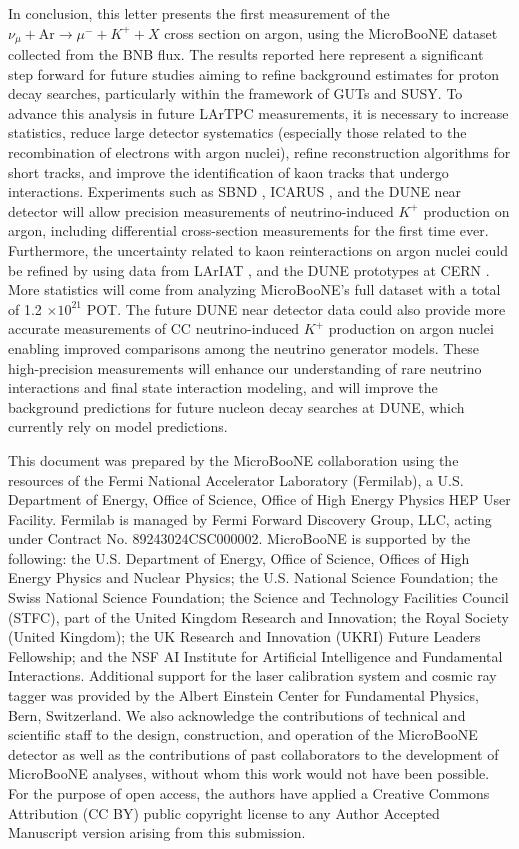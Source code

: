 \documentclass[aps,prd,longbibliography,twocolumn,showpacs,superscriptaddress,floatfix,10pt]{revtex4-1}
\begin{document}
In conclusion, this letter presents the first measurement of the $\nu_{\mu} + \text{Ar} \rightarrow \mu^{-} + K^{+} + X$ cross section on argon, using the MicroBooNE dataset collected from the BNB flux.
The results reported here represent a significant step forward for future studies aiming to refine background estimates for proton decay searches, particularly within the framework of GUTs and SUSY. To advance this analysis in future LArTPC measurements, it is necessary to increase statistics, reduce large detector systematics (especially those related to the recombination of electrons with argon nuclei), refine reconstruction algorithms for short tracks, and improve the identification of kaon tracks that undergo interactions. Experiments such as SBND \cite{sbndcollaboration2025shortbaselineneardetectorfermilab}, ICARUS \cite{AMERIO2004329}, and the DUNE near detector will allow precision measurements of neutrino-induced $K^+$ production on argon, including differential cross-section measurements for the first time ever. 
Furthermore, the uncertainty related to kaon reinteractions on argon nuclei could be refined by using data from LArIAT \cite{osti_1489387}, and the DUNE prototypes at CERN \cite{PhysRevD.110.092011}. More statistics will come from analyzing MicroBooNE's full dataset with a total of 1.2 $\times 10^{21}$ POT. The future DUNE near detector data could also provide more accurate measurements of CC neutrino-induced $K^{+}$ production on argon nuclei enabling improved comparisons among the neutrino generator models. These high-precision measurements will enhance our understanding of rare neutrino interactions and final state interaction modeling, and will improve the background predictions for future nucleon decay searches at DUNE, which currently rely on model predictions.

This document was prepared by the MicroBooNE collaboration using the resources of the Fermi National Accelerator Laboratory (Fermilab), a U.S. Department of Energy, Office of Science, Office of High Energy Physics HEP User Facility. Fermilab is managed by Fermi Forward Discovery Group, LLC, acting under Contract No. 89243024CSC000002. MicroBooNE is supported by the following: the U.S. Department of Energy, Office of Science, Offices of High Energy Physics and Nuclear Physics; the U.S. National Science Foundation; the Swiss National Science Foundation; the Science and Technology Facilities Council (STFC), part of the United Kingdom Research and Innovation; the Royal Society (United Kingdom); the UK Research and Innovation (UKRI) Future Leaders Fellowship; and the NSF AI Institute for Artificial Intelligence and Fundamental Interactions. Additional support for the laser calibration system and cosmic ray tagger was provided by the Albert Einstein Center for Fundamental Physics, Bern, Switzerland. We also acknowledge the contributions of technical and scientific staff to the design, construction, and operation of the MicroBooNE detector as well as the contributions of past collaborators to the development of MicroBooNE analyses, without whom this work would not have been possible. For the purpose of open access, the authors have applied a Creative Commons Attribution (CC BY) public copyright license to any Author Accepted Manuscript version arising from this submission.

 
\end{document}
